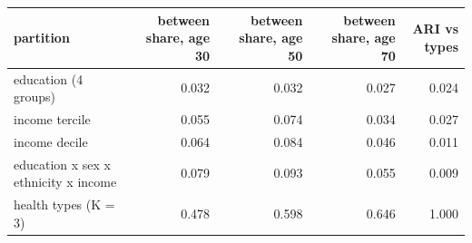\begin{tabular}{lrrrr}
\toprule
partition & between share, age 30 & between share, age 50 & between share, age 70 & ARI vs types \\
\midrule
education (4 groups) & 0.032 & 0.032 & 0.027 & 0.024 \\
income tercile & 0.055 & 0.074 & 0.034 & 0.027 \\
income decile & 0.064 & 0.084 & 0.046 & 0.011 \\
education x sex x ethnicity x income & 0.079 & 0.093 & 0.055 & 0.009 \\
health types (K = 3) & 0.478 & 0.598 & 0.646 & 1.000 \\
\bottomrule
\end{tabular}
